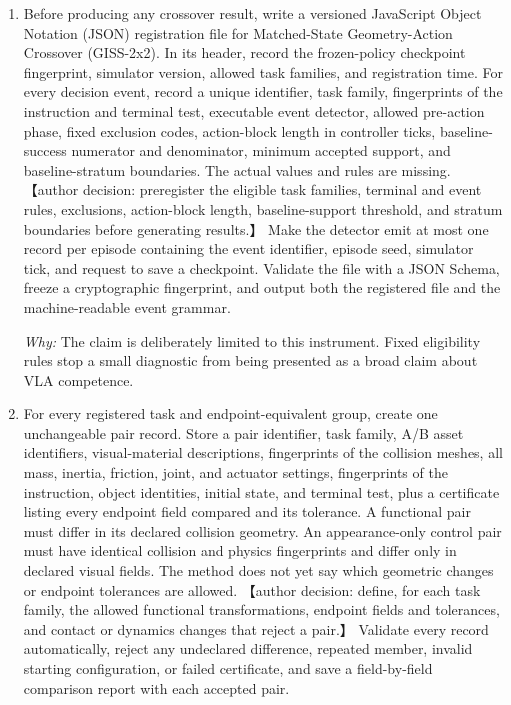 \documentclass[10pt,a4paper]{article}
\begin{document}
\begin{enumerate}[leftmargin=*,start=1]
  \item Before producing any crossover result, write a versioned JavaScript Object Notation (JSON) registration file for Matched-State Geometry-Action Crossover (GISS-2x2). In its header, record the frozen-policy checkpoint fingerprint, simulator version, allowed task families, and registration time. For every decision event, record a unique identifier, task family, fingerprints of the instruction and terminal test, executable event detector, allowed pre-action phase, fixed exclusion codes, action-block length in controller ticks, baseline-success numerator and denominator, minimum accepted support, and baseline-stratum boundaries. The actual values and rules are missing. 【author decision: preregister the eligible task families, terminal and event rules, exclusions, action-block length, baseline-support threshold, and stratum boundaries before generating results.】 Make the detector emit at most one record per episode containing the event identifier, episode seed, simulator tick, and request to save a checkpoint. Validate the file with a JSON Schema, freeze a cryptographic fingerprint, and output both the registered file and the machine-readable event grammar.
\par\emph{Why:} The claim is deliberately limited to this instrument. Fixed eligibility rules stop a small diagnostic from being presented as a broad claim about VLA competence.
  \item For every registered task and endpoint-equivalent group, create one unchangeable pair record. Store a pair identifier, task family, A/B asset identifiers, visual-material descriptions, fingerprints of the collision meshes, all mass, inertia, friction, joint, and actuator settings, fingerprints of the instruction, object identities, initial state, and terminal test, plus a certificate listing every endpoint field compared and its tolerance. A functional pair must differ in its declared collision geometry. An appearance-only control pair must have identical collision and physics fingerprints and differ only in declared visual fields. The method does not yet say which geometric changes or endpoint tolerances are allowed. 【author decision: define, for each task family, the allowed functional transformations, endpoint fields and tolerances, and contact or dynamics changes that reject a pair.】 Validate every record automatically, reject any undeclared difference, repeated member, invalid starting configuration, or failed certificate, and save a field-by-field comparison report with each accepted pair.

\end{enumerate}
\end{document}
